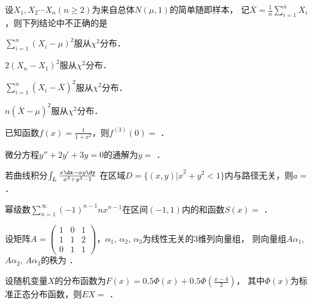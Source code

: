 \documentclass[plain,noanswer,medmath]{../../template/jnuexam}
\begin{document}
\begin{problem}
设$X_1,X_2 \cdots X_n(n \ge 2)$为来自总体$N(\mu ,1)$的简单随即样本，
记$\overline{X} = \frac{1}{n}\sum_{i = 1}^n X_i$，则下列结论中不正确的是\pickout{}
\begin{abcd}
\item $\sum_{i = 1}^n (X_i - \mu)^2$服从$\chi^2$分布．
\item $2(X_n - X_1)^2$服从$\chi^2$分布．
\item $\sum_{i = 1}^n (X_i - \overline{X})^2$服从$\chi^2$分布．
\item $n(\overline{X} - \mu)^2$服从$\chi^2$分布．
\end{abcd}
\end{problem}




\begin{problem}
已知函数$f(x) = \frac{1}{1 + x^2}$，则$f^{(3)}(0) =$ \fillin{}．
\end{problem}


\begin{problem}
微分方程$y'' + 2y' + 3y = 0$的通解为$y =$ \fillin{}．
\end{problem}


\begin{problem}
若曲线积分$\int_L \frac{x\dx - ay\dy}{x^2 + y^2 - 1}$
在区域$D = \{(x,y) \left| x \right.^2 + y^2 < 1\}$内与路径无关，则$a =$ \fillin{}．
\end{problem}


\begin{problem}
幂级数$\sum_{n = 1}^{\infty}(- 1)^{n - 1} nx^{n - 1}$在区间$(- 1,1)$内的和函数$S(x) =$ \fillin{}．
\end{problem}


\begin{problem}
设矩阵$A = \begin{pmatrix}
  1 & 0 & 1 \\
  1 & 1 & 2 \\
  0 & 1 & 1
\end{pmatrix}$，$\alpha_1$, $\alpha_2$, $\alpha_3$为线性无关的$3$维列向量组，
则向量组$A\alpha_1$, $A\alpha_2$, $A\alpha_3$的秩为 \fillin{}．
\end{problem}


\begin{problem}
设随机变量$X$的分布函数为$F(x) = 0.5\Phi(x) + 0.5\Phi \left(\frac{x - 4}{2} \right)$，
其中$\Phi (x)$为标准正态分布函数，则$EX =$ \fillin{}．
\end{problem}
\end{document}

